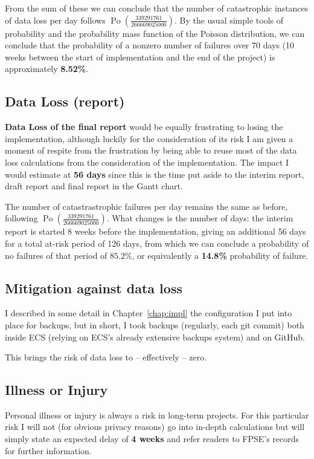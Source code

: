 From the sum of these we can conclude that the number of catastrophic
instances of data loss per day follows $\operatorname{Po}(\frac{339291761}
{266669025000})$. By the usual simple tools of probability and the
probability mass function of the Poisson distribution, we can
conclude that the probability of a nonzero number of failures over
70 days (10 weeks between the start of implementation and the end
of the project) is approximately \textbf{8.52\%}.

\subsection{Data Loss (report)}

\textbf{Data Loss of the final report} would be equally frustrating to
losing the implementation, although luckily for the consideration of its
risk I am given a moment of respite from the frustration by being able to
reuse most of the data loss calculations from the consideration of the
implementation. The impact I would estimate at \textbf{56 days} since this
is the time put aside to the interim report, draft report and final report
in the Gantt chart.

The number of catastrastrophic failures per day remains the same as before,
following $\operatorname{Po}(\frac{339291761}{266669025000})$. What changes
is the number of days: the interim report is started 8 weeks before the
implementation, giving an additional 56 days for a total at-risk period of
126 days, from which we can conclude a probability of no failures of that period
of $85.2\%$, or equivalently a \textbf{14.8\%} probability of failure.

\subsection{Mitigation against data loss}

I described in some detail in Chapter\ \ref{chap:impl} the configuration
I put into place for backups, but in short, I took backups (regularly,
each git commit) both inside ECS (relying on ECS's already extensive
backups system) and on GitHub.

This brings the risk of data loss to -- effectively -- zero.

\subsection{Illness or Injury}

Personal illness or injury is always a risk in long-term projects.
For this particular risk I will not (for obvious privacy reasons)
go into in-depth calculations but will simply state an expected
delay of \textbf{4 weeks} and refer readers to FPSE's records for
further information.

